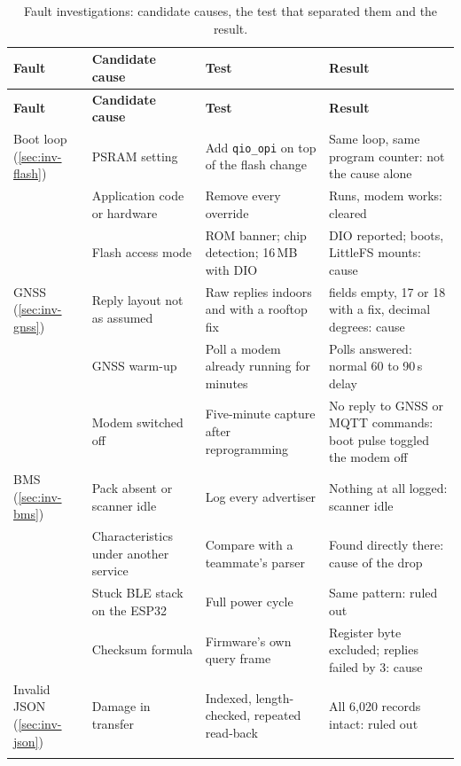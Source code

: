 {\small
\begin{longtable}{|>{\raggedright\arraybackslash}p{2.1cm}|>{\raggedright\arraybackslash}p{3.6cm}|>{\raggedright\arraybackslash}p{4.3cm}|>{\raggedright\arraybackslash}p{3.7cm}|}
\caption[Fault investigations: candidate causes, the test that separated them and the result]{Fault investigations: candidate causes, the test that separated them and the result.}
\label{tab:investigations}\\
\hline
\textbf{Fault} & \textbf{Candidate cause} & \textbf{Test} & \textbf{Result} \\ \hline
\endfirsthead
\hline
\textbf{Fault} & \textbf{Candidate cause} & \textbf{Test} & \textbf{Result} \\ \hline
\endhead
Boot loop (\ref{sec:inv-flash}) & PSRAM setting & Add \texttt{qio\_opi} on top of the flash change & Same loop, same program counter: not the cause alone \\ \cline{2-4}
 & Application code or hardware & Remove every override & Runs, modem works: cleared \\ \cline{2-4}
 & Flash access mode & ROM banner; chip detection; 16\,MB with DIO & DIO reported; boots, LittleFS mounts: cause \\ \hline
GNSS (\ref{sec:inv-gnss}) & Reply layout not as assumed & Raw replies indoors and with a rooftop fix & 9 fields empty, 17 or 18 with a fix, decimal degrees: cause \\ \cline{2-4}
 & GNSS warm-up & Poll a modem already running for minutes & Polls answered: normal 60 to 90\,s delay \\ \cline{2-4}
 & Modem switched off & Five-minute capture after reprogramming & No reply to GNSS or MQTT commands: boot pulse toggled the modem off \\ \hline
BMS (\ref{sec:inv-bms}) & Pack absent or scanner idle & Log every advertiser & Nothing at all logged: scanner idle \\ \cline{2-4}
 & Characteristics under another service & Compare with a teammate's parser & Found directly there: cause of the drop \\ \cline{2-4}
 & Stuck BLE stack on the ESP32 & Full power cycle & Same pattern: ruled out \\ \cline{2-4}
 & Checksum formula & Firmware's own query frame & Register byte excluded; replies failed by 3: cause \\ \hline
Invalid JSON (\ref{sec:inv-json}) & Damage in transfer & Indexed, length-checked, repeated read-back & All 6,020 records intact: ruled out \\ \cline{2-4}

\end{longtable}}
